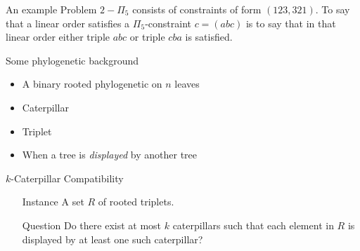 \documentclass{beamer}
\begin{document}
\begin{frame}{An example}
 Problem $2-\Pi_5$ consists of constraints of form $(123,321)$. To say that a linear order satisfies a $\Pi_5$-constraint $c=(abc)$ is to say that in that linear order either triple $abc$ or triple $cba$ is satisfied.
\end{frame}


\begin{frame}{Some phylogenetic background}
\begin{itemize}
 \item A binary rooted phylogenetic on $n$ leaves
 \item Caterpillar
 \item Triplet
 \item When a tree is \textit{displayed} by another tree
\end{itemize}

 
\end{frame}


\begin{frame}{$k$-Caterpillar Compatibility}
\begin{itemize}
\item[Instance] A set $R$ of rooted triplets.
\item[Question] Do there exist at most $k$ caterpillars such that each element in $R$ is displayed by at least one such caterpillar?
\end{itemize}
\end{frame}
\end{document}
